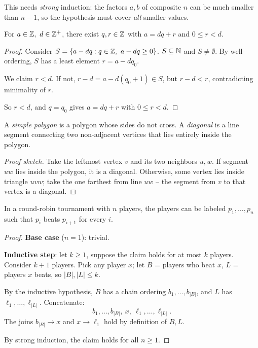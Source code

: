 \begin{note}
This needs \emph{strong} induction: the factors $a,b$ of composite $n$ can be much smaller than $n-1$, so the hypothesis must cover \emph{all} smaller values.
\end{note}

\bigskip
\begin{example}
For $a\in\mathbb{Z},\ d\in\mathbb{Z}^+$, there exist $q,r\in\mathbb{Z}$ with $a=dq+r$ and $0\le r<d$.
\end{example}
\begin{proof}
Consider $S = \{a-dq : q\in\mathbb{Z},\ a-dq\ge0\}$. $S\subseteq\mathbb{N}$ and $S\neq\emptyset$. By well-ordering, $S$ has a least element $r=a-dq_0$.

We claim $r<d$. If not, $r-d = a-d(q_0+1) \in S$, but $r-d<r$, contradicting minimality of $r$.

So $r<d$, and $q=q_0$ gives $a=dq+r$ with $0\le r<d$.
\end{proof}

\bigskip
\begin{definition}
A \emph{simple polygon} is a polygon whose sides do not cross. A \emph{diagonal} is a line segment connecting two non-adjacent vertices that lies entirely inside the polygon.
\end{definition}

\begin{lemma}
\end{lemma}
\begin{proof}[Proof sketch]
Take the leftmost vertex $v$ and its two neighbors $u,w$. If segment $uw$ lies inside the polygon, it is a diagonal. Otherwise, some vertex lies inside triangle $uvw$; take the one farthest from line $uw$ -- the segment from $v$ to that vertex is a diagonal.
\end{proof}


\bigskip
\begin{example}
In a round-robin tournament with $n$ players, the players can be labeled $p_1,\dots,p_n$ such that $p_i$ beats $p_{i+1}$ for every $i$.
\end{example}
\begin{proof}
\textbf{Base case} ($n=1$): trivial.

\textbf{Inductive step}: let $k\ge1$, suppose the claim holds for at most $k$ players. Consider $k+1$ players. Pick any player $x$; let $B$ = players who beat $x$, $L$ = players $x$ beats, so $|B|,|L|\le k$.

By the inductive hypothesis, $B$ has a chain ordering $b_1,\dots,b_{|B|}$, and $L$ has $\ell_1,\dots,\ell_{|L|}$. Concatenate:
\[
b_1,\dots,b_{|B|},\ x,\ \ell_1,\dots,\ell_{|L|}.
\]
The joins $b_{|B|}\to x$ and $x\to\ell_1$ hold by definition of $B,L$.

By strong induction, the claim holds for all $n\ge1$.
\end{proof}
